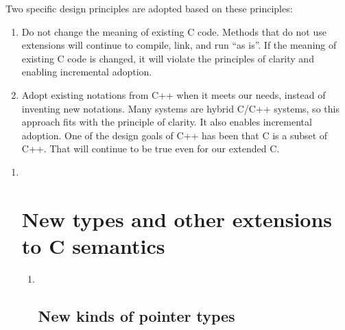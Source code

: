 \documentclass[]{article}
\begin{document}
Two specific design principles are adopted based on these principles:

\begin{enumerate}
\def\labelenumi{\Roman{enumi}.}
\item
  Do not change the meaning of existing C code. Methods that do not use
  extensions will continue to compile, link, and run ``as is''. If the
  meaning of existing C code is changed, it will violate the principles
  of clarity and enabling incremental adoption.
\item
  Adopt existing notations from C++ when it meets our needs, instead of
  inventing new notations. Many systems are hybrid C/C++ systems, so
  this approach fits with the principle of clarity. It also enables
  incremental adoption. One of the design goals of C++ has been that C
  is a subset of C++. That will continue to be true even for our
  extended C.
\end{enumerate}

\begin{enumerate}
\def\labelenumi{\arabic{enumi}.}
\item ~
  \section{\texorpdfstring{\protect\hypertarget{ux5fRef426456406}{}{\protect\hypertarget{ux5fToc426641054}{}{\protect\hypertarget{ux5fToc435434914}{}{\protect\hypertarget{ux5fToc437460735}{}{\protect\hypertarget{ux5fToc440445409}{}{\protect\hypertarget{ux5fToc440449191}{}{\protect\hypertarget{ux5fToc440551841}{}{}}}}}}}New
  types and other extensions to C
  semantics}{New types and other extensions to C semantics}}\label{new-types-and-other-extensions-to-c-semantics}

  \begin{enumerate}
  \def\labelenumii{\arabic{enumii}.}
  \item ~
    \subsection{\texorpdfstring{\protect\hypertarget{ux5fToc422906954}{}{\protect\hypertarget{ux5fToc424307677}{}{\protect\hypertarget{ux5fToc426641055}{}{\protect\hypertarget{ux5fToc435434915}{}{\protect\hypertarget{ux5fToc437460736}{}{\protect\hypertarget{ux5fToc440445410}{}{\protect\hypertarget{ux5fToc440449192}{}{\protect\hypertarget{ux5fToc440551842}{}{}}}}}}}}New
    kinds of pointer
    types}{New kinds of pointer types}}\label{new-kinds-of-pointer-types}
  \end{enumerate}
\end{enumerate}
\end{document}
